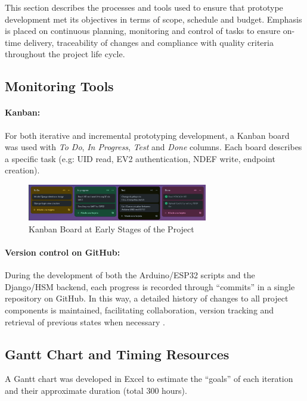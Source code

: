 This section describes the processes and tools used to ensure that prototype development met its objectives in terms of scope, schedule and budget. Emphasis is placed on continuous planning, monitoring and control of tasks to ensure on-time delivery, traceability of changes and compliance with quality criteria throughout the project life cycle.

\subsection{Monitoring Tools}

\paragraph{Kanban:} For both iterative and incremental prototyping development, a Kanban board was used with \textit{To Do}, \textit{In Progress}, \textit{Test} and \textit{Done} columns. Each board describes a specific task (e.g: UID read, EV2 authentication, NDEF write, endpoint creation).

\begin{figure}[H]
	\centering
	\includegraphics[width=0.7\textwidth]{imaxes/kanban.png} %
	\caption{Kanban Board at Early Stages of the Project}
	\label{fig:kanban}
\end{figure}

\paragraph{Version control on GitHub:} During the development of both the Arduino/ESP32 scripts and the Django/HSM backend, each progress is recorded through “commits” in a single repository on GitHub. In this way, a detailed history of changes to all project components is maintained, facilitating collaboration, version tracking and retrieval of previous states when necessary \cite{ref52, ref53}.

\subsection{Gantt Chart and Timing Resources}

A Gantt chart was developed in Excel to estimate the “goals” of each iteration and their approximate duration (total 300 hours).


